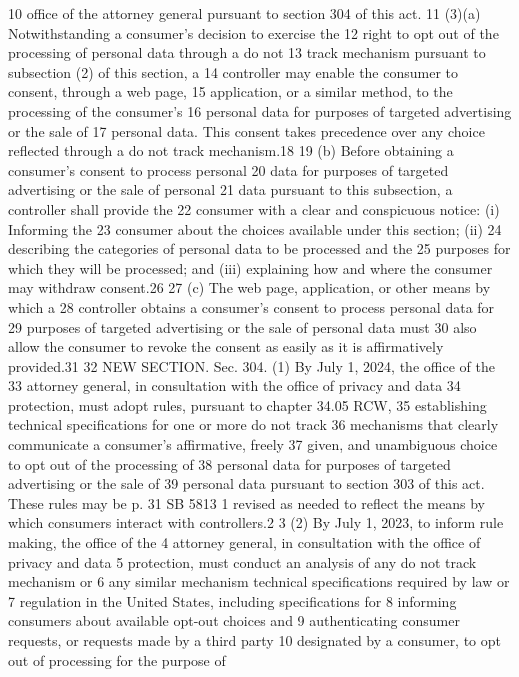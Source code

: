 10 office of the attorney general pursuant to section 304 of this act.
11 (3)(a) Notwithstanding a consumer's decision to exercise the
12 right to opt out of the processing of personal data through a do not
13 track mechanism pursuant to subsection (2) of this section, a
14 controller may enable the consumer to consent, through a web page,
15 application, or a similar method, to the processing of the consumer's
16 personal data for purposes of targeted advertising or the sale of
17 personal data. This consent takes precedence over any choice
reflected through a do not track mechanism.18
19 (b) Before obtaining a consumer's consent to process personal
20 data for purposes of targeted advertising or the sale of personal
21 data pursuant to this subsection, a controller shall provide the
22 consumer with a clear and conspicuous notice: (i) Informing the
23 consumer about the choices available under this section; (ii)
24 describing the categories of personal data to be processed and the
25 purposes for which they will be processed; and (iii) explaining how
and where the consumer may withdraw consent.26
27 (c) The web page, application, or other means by which a
28 controller obtains a consumer's consent to process personal data for
29 purposes of targeted advertising or the sale of personal data must
30 also allow the consumer to revoke the consent as easily as it is
affirmatively provided.31
32 NEW SECTION. Sec. 304. (1) By July 1, 2024, the office of the
33 attorney general, in consultation with the office of privacy and data
34 protection, must adopt rules, pursuant to chapter 34.05 RCW,
35 establishing technical specifications for one or more do not track
36 mechanisms that clearly communicate a consumer's affirmative, freely
37 given, and unambiguous choice to opt out of the processing of
38 personal data for purposes of targeted advertising or the sale of
39 personal data pursuant to section 303 of this act. These rules may be
p. 31 SB 5813
1 revised as needed to reflect the means by which consumers interact
with controllers.2
3 (2) By July 1, 2023, to inform rule making, the office of the
4 attorney general, in consultation with the office of privacy and data
5 protection, must conduct an analysis of any do not track mechanism or
6 any similar mechanism technical specifications required by law or
7 regulation in the United States, including specifications for
8 informing consumers about available opt-out choices and
9 authenticating consumer requests, or requests made by a third party
10 designated by a consumer, to opt out of processing for the purpose of
